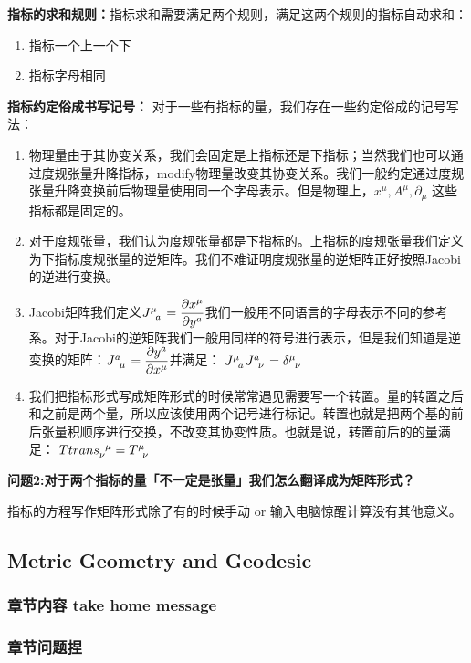 \textbf{指标的求和规则：}指标求和需要满足两个规则，满足这两个规则的指标自动求和：
\begin{enumerate}
  \item 指标一个上一个下
  \item 指标字母相同
\end{enumerate}

\textbf{指标约定俗成书写记号：}
对于一些有指标的量，我们存在一些约定俗成的记号写法：
\begin{enumerate}
  \item 物理量由于其协变关系，我们会固定是上指标还是下指标；当然我们也可以通过度规张量升降指标，modify物理量改变其协变关系。我们一般约定通过度规张量升降变换前后物理量使用同一个字母表示。但是物理上，$ x^\mu, A^\mu, \partial_\mu$ 这些指标都是固定的。
  \item 对于度规张量，我们认为度规张量都是下指标的。上指标的度规张量我们定义为下指标度规张量的逆矩阵。我们不难证明度规张量的逆矩阵正好按照Jacobi的逆进行变换。
  \item Jacobi矩阵我们定义$ \tensor{J}{^\mu_a} = \displaystyle\frac{\partial x^\mu}{\partial y^a} $我们一般用不同语言的字母表示不同的参考系。对于Jacobi的逆矩阵我们一般用同样的符号进行表示，但是我们知道是逆变换的矩阵：$ \tensor{J}{^a_\mu} = \displaystyle\frac{\partial y^a}{\partial x^\mu} $并满足： $ \tensor{J}{^\mu_a}\tensor{J}{^a_\nu} = \tensor{\delta}{^\mu_\nu} $ 
  \item 我们把指标形式写成矩阵形式的时候常常遇见需要写一个转置。量的转置之后和之前是两个量，所以应该使用两个记号进行标记。转置也就是把两个基的前后张量积顺序进行交换，不改变其协变性质。也就是说，转置前后的的量满足：
    $ \tensor{Ttrans}{_\nu^\mu} = \tensor{T}{^\mu_\nu} $
\end{enumerate}

\bigskip
\textbf{问题2:对于两个指标的量「不一定是张量」我们怎么翻译成为矩阵形式？}

指标的方程写作矩阵形式除了有的时候手动 or 输入电脑惊醒计算没有其他意义。


\subsection{Metric Geometry and Geodesic}

\subsubsection{章节内容 take home message}



\subsubsection{章节问题捏}



